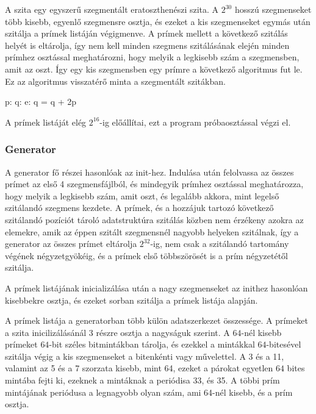 A szita egy egyszerű szegmentált eratoszthenészi szita.
A $2^{30}$ hosszú szegmenseket több kisebb, egyenlő szegmensre osztja, és ezeket a kis szegmenseket
egymás után szitálja a prímek listáján végigmenve.
A prímek mellett a következő szitálás helyét is eltárolja, így nem kell minden szegmens szitálásának elején minden prímhez osztással meghatározni, hogy melyik a legkisebb szám a szegmensben, amit az oszt.
Így egy kis szegmensben egy prímre a következő algoritmus fut le.
Ez az algoritmus visszatérő minta a szegmentált szitákban.

\begin{algorithmic}[1]
\State p: 
\State q: 
\State e: 
	\State {}
	\State q = q + 2p
\EndWhile
\end{algorithmic}

A prímek listáját elég $2^{16}$-ig előállítai, ezt a program próbaosztással végzi el.

\subsubsection{Generator}

A generator fő részei hasonlóak az init-hez.
Indulása után felolvassa az összes prímet az első 4 szegmensfájlból, és mindegyik prímhez osztással meghatározza, hogy melyik a legkisebb szám, amit oszt, és legalább akkora, mint legelső
szitálandó szegmens kezdete.
A prímek, és a hozzájuk tartozó következő szitálandó pozíciót tároló adatstruktúra szitálás közben
nem érzékeny azokra az elemekre, amik az éppen szitált szegmensnél nagyobb helyeken szitálnak, így a generator az összes prímet eltárolja $2^{32}$-ig, nem csak a szitálandó tartomány végének négyzetgyökéig, és a prímek első többszörösét is a prím négyzetétől szitálja.

A prímek listájának inicializálása után a nagy szegmenseket az inithez hasonlóan kisebbekre osztja,
és ezeket sorban szitálja a prímek listája alapján.

A prímek listája a generatorban több külön adatszerkezet összessége.
A prímeket a szita inicilizálásánál 3 részre osztja a nagyságuk szerint.
A $64$-nél kisebb prímeket $64$-bit széles bitmintákban tárolja, és ezekkel a mintákkal $64$-bitesével szitálja végig a kis szegmenseket a bitenkénti vagy művelettel.
A 3 és a 11, valamint az 5 és a 7 szorzata kisebb, mint 64, ezeket a párokat egyetlen $64$ bites mintába fejti ki, ezeknek a mintáknak a periódisa 33, és 35.
A többi prím mintájának periódusa a legnagyobb olyan szám, ami 64-nél kisebb, és a prím osztja.

